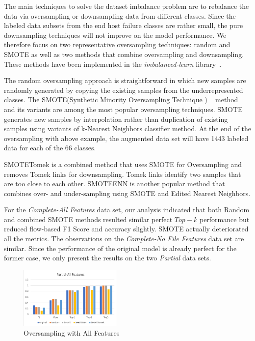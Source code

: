 The main techniques to solve the dataset imbalance problem are to rebalance the data via oversampling or downsampling data from different classes. Since the labeled data subsets from the end host failure classes are rather small, the pure downsampling techniques will not improve on the model performance. We therefore focus on two representative oversampling techniques: random and SMOTE as well as two methods that combine oversampling and downsampling.
These methods have been implemented in the {\it imbalanced-learn} library~\cite{imbalance-learn:web}.

The random oversampling approach is straightforward in which new samples are randomly generated by copying the existing samples from the underrepresented classes. The SMOTE(Synthetic Minority Oversampling Technique ) ~\cite{smote:2002} method and its variants are among the most popular oversampling techniques. SMOTE generates new samples by interpolation rather than duplication of existing samples using variants of k-Nearest Neighbors classifier method. At the end of the oversampling with above example, the augmented data set will have 1443 labeled data for each of the 66 classes. 

SMOTETomek is a combined method that uses SMOTE for Oversampling and removes Tomek links for downsampling. Tomek links identify two samples that are too close to each other. SMOTEENN is another popular method that combines over- and under-sampling using SMOTE and Edited Nearest Neighbors.

For the  {\it Complete-All Features} data set, our analysis indicated that both Random and combined SMOTE methods resulted similar perfect $Top-k$ performance but reduced flow-based F1 Score and accuracy slightly. SMOTE actually deteriorated all the metrics. The observations on the  {\it Complete-No File Features} data set are similar. Since the performance of the original model is already perfect for the former case, we only present the results on the two {\it Partial} data sets.


\begin{figure}[!ht]
\begin{center}
\includegraphics[width=0.45\textwidth]{./figure/partial-all-oversampling}
\end{center}
\caption{Oversampling with All Features}
\label{fig:dt}
\end{figure}

